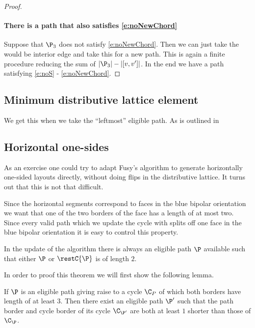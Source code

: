 \begin{proof}

\paragraph{There is a path that also satisfies \ref{e:noNewChord}}
Suppose that $\P_3$ does not satisfy \ref{e:noNewChord}. Then we can just take the would be interior edge and take this for a new path. This is again a finite procedure reducing the sum of $|\P_3| -|[v,v']|$. In the end we have a path satisfying \ref{e:noS} - \ref{e:noNewChord}.



\end{proof}


\subsection{Minimum distributive lattice element}
\label{ss:minimal}
We get this when we take the ``leftmost'' eligible path. As is outlined in \cite{Fusy2006}

\renewcommand{\F}{\scr F}
\subsection{Horizontal one-sides}
\label{ss:blue}

As an exercise one could try to adapt Fusy's algorithm to generate horizontally one-sided layouts directly, without doing flips in the distributive lattice. It turns out that this is not that difficult.

Since the horizontal segments correspond to faces in the blue bipolar orientation we want that one of the two borders of the face has a length of at most two. Since every valid path which we update the cycle with splits off one face in the blue bipolar orientation it is easy to control this property.

\begin{thrm}
\label{th:blueelig}
In the update of the algorithm there is always an eligible path $\P$ available such that either $\P$ or $\restC{\P}$ is of length $2$.
\end{thrm}

In order to proof this theorem we will first show the following lemma.

\begin{lemma}
\label{lem:bluealgo}
If $\P$ is an eligible path giving raise to a cycle $\C_P$ of which both borders have length of at least $3$. Then there exist an eligible path $\P'$ such that the path border and cycle border of its cycle $\C_{\P'}$ are both at least $1$ shorter than those of $\C_\P$.
\end{lemma}

